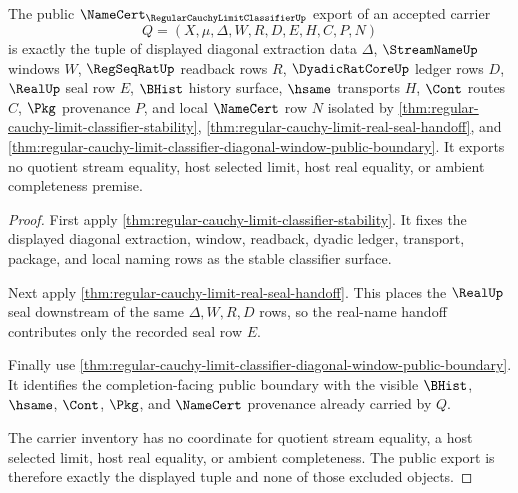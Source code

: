 \begin{theorem}
\label{thm:regular-cauchy-limit-classifier-public-export}
The public $\NameCert_{\RegularCauchyLimitClassifierUp}$ export of an accepted carrier
$$
Q=(X,\mu,\Delta,W,R,D,E,H,C,P,N)
$$
is exactly the tuple of displayed diagonal extraction data $\Delta$, $\StreamNameUp$ windows $W$, $\RegSeqRatUp$ readback rows $R$, $\DyadicRatCoreUp$ ledger rows $D$, $\RealUp$ seal row $E$, $\BHist$ history surface, $\hsame$ transports $H$, $\Cont$ routes $C$, $\Pkg$ provenance $P$, and local $\NameCert$ row $N$ isolated by \autoref{thm:regular-cauchy-limit-classifier-stability}, \autoref{thm:regular-cauchy-limit-real-seal-handoff}, and \autoref{thm:regular-cauchy-limit-classifier-diagonal-window-public-boundary}. It exports no quotient stream equality, host selected limit, host real equality, or ambient completeness premise.
\end{theorem}
\begin{proof}
First apply \autoref{thm:regular-cauchy-limit-classifier-stability}. It fixes the displayed diagonal extraction, window, readback, dyadic ledger, transport, package, and local naming rows as the stable classifier surface.

Next apply \autoref{thm:regular-cauchy-limit-real-seal-handoff}. This places the $\RealUp$ seal downstream of the same $\Delta,W,R,D$ rows, so the real-name handoff contributes only the recorded seal row $E$.

Finally use \autoref{thm:regular-cauchy-limit-classifier-diagonal-window-public-boundary}. It identifies the completion-facing public boundary with the visible $\BHist$, $\hsame$, $\Cont$, $\Pkg$, and $\NameCert$ provenance already carried by $Q$.

The carrier inventory has no coordinate for quotient stream equality, a host selected limit, host real equality, or ambient completeness. The public export is therefore exactly the displayed tuple and none of those excluded objects.
\end{proof}

